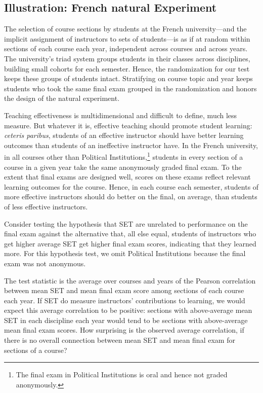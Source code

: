 \documentclass[12pt]{article}
\begin{document}
\subsection{Illustration: French natural Experiment} \label{sec:boringMethods}
The selection of course sections by students at the French university---and the implicit 
assignment of instructors to sets of students---is as if at random within sections of each
course each year, independent across courses and across years.
The university's triad system groups students in their classes across disciplines,
building small cohorts for each semester.
Hence, the randomization for our test keeps these groups of students intact.
Stratifying on course topic and year keeps students who took the same final
exam grouped in the randomization and honors the design of the natural experiment.

Teaching effectiveness is multidimensional \citep{Marsh1997} and difficult to define,
much less measure. 
But whatever it is, effective teaching should promote student learning:
\emph{ceteris paribus},
students of an effective instructor should have better learning outcomes
than students of an ineffective instructor have.
In the French university, in all courses other than Political Institutions,\footnote{%
 The final exam in Political Institutions is oral and hence not graded anonymously.
}
students in every section of a course in a given year take the same anonymously graded
final exam.
To the extent that final exams are designed well, scores on these exams reflect relevant 
learning outcomes for the course.
Hence, in each course each semester, students of more effective instructors should do better 
on the final, on average, than students of less effective instructors.

Consider testing the hypothesis that SET are unrelated to performance on the final exam
against the alternative that, all else equal, students of instructors who get higher average SET
get higher final exam scores, indicating that they learned more.
For this hypothesis test, we omit Political Institutions because the final exam was not
anonymous.

The test statistic is the average over courses and years of the Pearson correlation between
mean SET and mean final exam score among sections of each course each year.
If SET do measure instructors' contributions to learning, we would expect this average
correlation to be positive: sections with above-average mean SET in each discipline each year
would tend to be sections with above-average mean final exam scores.
How surprising is the observed average correlation, if there is no overall
connection between mean SET and mean final exam for sections of a course?
\end{document}
